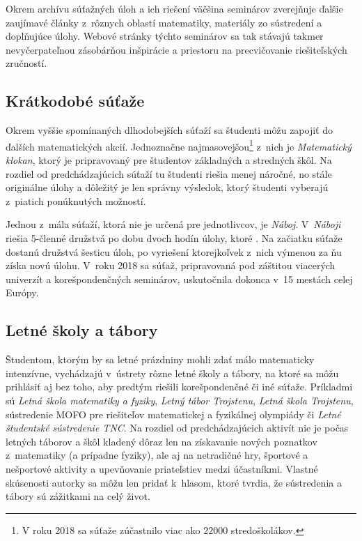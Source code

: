 Okrem archívu súťažných úloh a ich riešení väčšina seminárov zverejňuje ďalšie zaujímavé články z~rôznych oblastí matematiky, materiály zo sústredení a doplňujúce úlohy. Webové stránky týchto seminárov sa tak stávajú takmer nevyčerpateľnou zásobárňou inšpirácie a priestoru na precvičovanie riešiteľských zručností.


\subsection*{Krátkodobé súťaže}

Okrem vyššie spomínaných dlhodobejších súťaží sa študenti môžu zapojiť do ďalších matematických akcií. Jednoznačne najmasovejšou\footnote{V roku 2018 sa súťaže zúčastnilo viac ako $22000$ stredoškolákov.} z~nich je \textit{Matematický klokan}, ktorý je pripravovaný pre študentov základných a stredných škôl. Na rozdiel od predchádzajúcich súťaží tu študenti riešia menej náročné, no stále originálne úlohy a dôležitý je len správny výsledok, ktorý študenti vyberajú z~piatich ponúknutých možností.

Jednou z~mála súťaží, ktorá nie je určená pre jednotlivcov, je \textit{Náboj}. V~\textit{Náboji} riešia 5-členné družstvá po dobu dvoch hodín úlohy, ktoré . Na začiatku súťaže dostanú družstvá šesticu úloh, po vyriešení ktorejkoľvek z~nich výmenou za ňu získa novú úlohu. V~roku 2018 sa súťaž, pripravovaná pod záštitou viacerých univerzít a korešpondenčných seminárov, uskutočnila dokonca v~15 mestách celej Európy.

\subsection*{Letné školy a tábory}

Študentom, ktorým by sa letné prázdniny mohli zdať málo matematicky intenzívne, vychádzajú v~ústrety rôzne letné školy a tábory, na ktoré sa môžu prihlásiť aj bez toho, aby predtým riešili korešpondenčné či iné súťaže. Príkladmi sú \textit{Letná škola matematiky a fyziky}, \textit{Letný tábor Trojstenu}, \textit{Letná škola Trojstenu}, sústredenie MOFO pre riešiteľov matematickej a fyzikálnej olympiády či \textit{Letné študentské sústredenie TNC}. Na rozdiel od predchádzajúcich aktivít nie je počas letných táborov a škôl kladený dôraz len na získavanie nových poznatkov z~matematiky (a prípadne fyziky), ale aj na netradičné hry, športové a nešportové aktivity a upevňovanie priateľstiev medzi účastníkmi. Vlastné skúsenosti autorky sa môžu len pridať k~hlasom, ktoré tvrdia, že sústredenia a tábory sú zážitkami na celý život.


